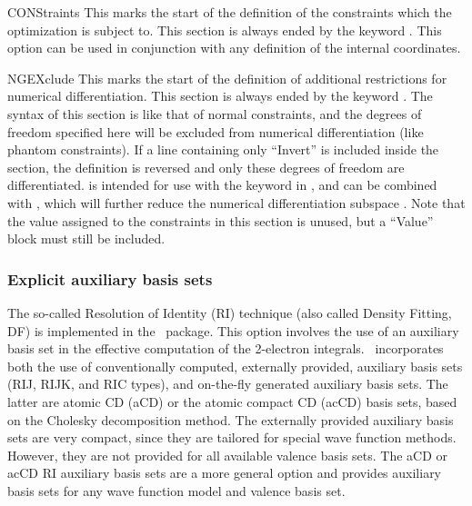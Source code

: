 \begin{keywordlist}
\item[CONStraints]
This marks the start of the definition of the constraints
which the optimization is subject to.
This section is always ended by the keyword
.
This option can be used in conjunction with any definition of the
internal coordinates.
\item[NGEXclude]
This marks the start of the definition of additional restrictions for numerical differentiation.
This section is always ended by the keyword .
The syntax of this section is like that of normal constraints, and the degrees of
freedom specified here will be excluded from numerical differentiation (like phantom constraints).
If a line containing only ``Invert'' is included inside the section,
the definition is reversed and only these degrees of freedom are differentiated.
 is intended for use with the  keyword in ,
and can be combined with , which will further reduce
the numerical differentiation subspace \cite{Stenrup2015}.
Note that the value assigned to the constraints in this section is unused, but a ``Value'' block
must still be included.
\end{keywordlist}

\subsubsection{Explicit auxiliary basis sets}
The so-called Resolution of Identity (RI) technique (also called Density
Fitting, DF) is implemented in the \molcas\ package. This option involves the use
of an auxiliary basis set in the effective computation of the 2-electron
integrals. \molcas\ incorporates both the use of conventionally computed,
externally provided, auxiliary basis sets (RIJ, RIJK, and RIC types), and
on-the-fly generated auxiliary basis sets. The latter are atomic CD (aCD) or the
atomic compact CD (acCD) basis
sets, based on the Cholesky decomposition method. The externally provided
auxiliary basis sets are very compact, since they are tailored for special
wave function methods. However, they are not provided for all available valence
basis sets. The aCD or acCD RI auxiliary basis sets are a more general option and
provides auxiliary basis sets for any wave function model and valence basis set.

